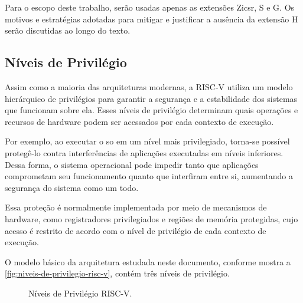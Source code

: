 Para o escopo deste trabalho, serão usadas apenas as extensões Zicsr, S e G. Os motivos e estratégias adotadas para mitigar e justificar a
ausência da extensão H serão discutidas ao longo do texto.

\subsection{Níveis de Privilégio}

Assim como a maioria das arquiteturas modernas, a RISC-V utiliza um modelo hierárquico de privilégios para garantir a segurança
e a estabilidade dos sistemas que funcionam sobre ela. Esses níveis de privilégio determinam quais operações e recursos de hardware podem ser acessados
por cada contexto de execução.

Por exemplo, ao executar o \gls{so} em um nível mais privilegiado, torna-se possível protegê-lo contra interferências de aplicações executadas em
níveis inferiores. Dessa forma, o sistema operacional pode impedir tanto que aplicações comprometam seu funcionamento quanto que interfiram entre si,
aumentando a segurança do sistema como um todo.

Essa proteção é normalmente implementada por meio de mecanismos de hardware, como registradores privilegiados e regiões de memória protegidas, 
cujo acesso é restrito de acordo com o nível de privilégio de cada contexto de execução.


O modelo básico da arquitetura estudada neste documento, conforme mostra a \autoref{fig:niveis-de-privilegio-risc-v}, contém três níveis de privilégio.

\begin{figure}[htbp]
    \centering
    \caption{Níveis de Privilégio RISC-V.}
    \label{fig:niveis-de-privilegio-risc-v}
\end{figure}

